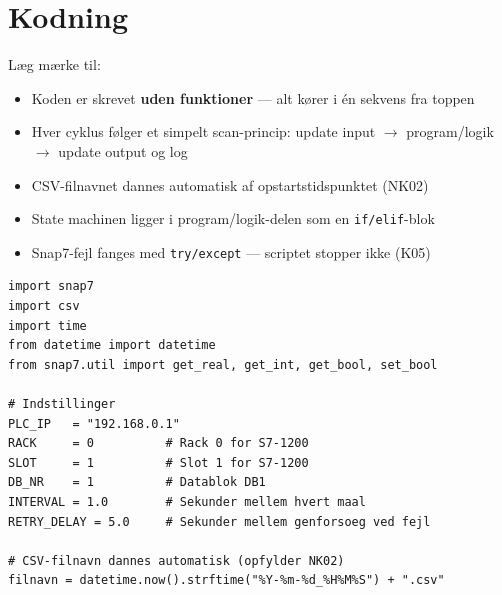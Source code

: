 \documentclass[12pt, a4paper]{article}
\begin{document}
\section{Kodning}

\begin{tcolorbox}[infobox, title={\faInfoCircle\quad Inden du læser koden}]
Læg mærke til:
\begin{itemize}[leftmargin=1.2em, itemsep=2pt]
  \item Koden er skrevet \textbf{uden funktioner} --- alt kører i én sekvens fra toppen
  \item Hver cyklus følger et simpelt scan-princip: update input $\rightarrow$ program/logik $\rightarrow$ update output og log
  \item CSV-filnavnet dannes automatisk af opstartstidspunktet (NK02)
  \item State machinen ligger i program/logik-delen som en \texttt{if/elif}-blok
  \item Snap7-fejl fanges med \texttt{try/except} --- scriptet stopper ikke (K05)
\end{itemize}
\end{tcolorbox}

\vspace{0.3cm}

\begin{tcolorbox}[codebox,
  title={\faPython\quad \texttt{vandstand.py} \textnormal{\textcolor{white!60!siemensblue}{\small --- del 1/4: imports og indstillinger}}}]
\begin{lstlisting}[style=python]
import snap7
import csv
import time
from datetime import datetime
from snap7.util import get_real, get_int, get_bool, set_bool

# Indstillinger
PLC_IP   = "192.168.0.1"
RACK     = 0          # Rack 0 for S7-1200
SLOT     = 1          # Slot 1 for S7-1200
DB_NR    = 1          # Datablok DB1
INTERVAL = 1.0        # Sekunder mellem hvert maal
RETRY_DELAY = 5.0     # Sekunder mellem genforsoeg ved fejl

# CSV-filnavn dannes automatisk (opfylder NK02)
filnavn = datetime.now().strftime("%Y-%m-%d_%H%M%S") + ".csv"
\end{lstlisting}
\end{tcolorbox}
\end{document}
